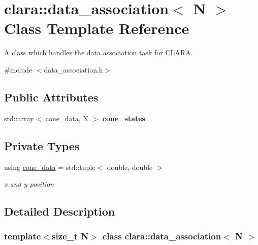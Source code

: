 \hypertarget{classclara_1_1data__association}{}\section{clara\+:\+:data\+\_\+association$<$ N $>$ Class Template Reference}
\label{classclara_1_1data__association}


A class which handles the data association task for C\+L\+A\+RA.  




{\ttfamily \#include $<$data\+\_\+association.\+h$>$}

\subsection*{Public Attributes}
\begin{DoxyCompactItemize}
\item 
\mbox{\label{classclara_1_1data__association_a50e3471d0e0ae81acb13596e07c8b154}} 
std\+::array$<$ \hyperlink{classclara_1_1data__association_a8bd65eee5fba8dcaa35d96b1c3c6daa2}{cone\+\_\+data}, N $>$ {\bfseries cone\+\_\+states}
\end{DoxyCompactItemize}
\subsection*{Private Types}
\begin{DoxyCompactItemize}
\item 
\mbox{\label{classclara_1_1data__association_a8bd65eee5fba8dcaa35d96b1c3c6daa2}} 
using \hyperlink{classclara_1_1data__association_a8bd65eee5fba8dcaa35d96b1c3c6daa2}{cone\+\_\+data} = std\+::tuple$<$ double, double $>$
\begin{DoxyCompactList}\small\item\em {\ttfamily x} and {\ttfamily y} position \end{DoxyCompactList}\end{DoxyCompactItemize}


\subsection{Detailed Description}
\subsubsection*{template$<$size\+\_\+t N$>$\newline
class clara\+::data\+\_\+association$<$ N $>$}

